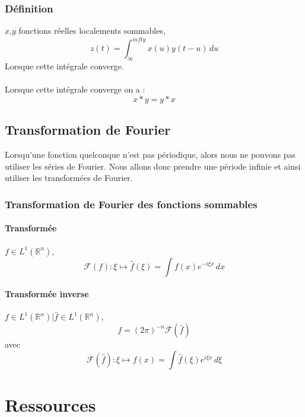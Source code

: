 \documentclass[a4paper]{book}
\begin{document}
\section{Définition}
$x$,$y$ fonctions réelles localements sommables,
\begin{equation}
	z(t) = \int_{\infty}^{infty} x(u) y(t-u) \, du
\end{equation}
Lorsque cette intégrale converge.\\
\\
Lorsque cette intégrale converge on a :
\begin{equation}
	x * y = y * x
\end{equation}

\chapter{Transformation de Fourier}
Lorsqu'une fonction quelconque n'est pas périodique, alors nous ne pouvons pas
utiliser les séries de Fourier. Nous allons donc prendre une période infinie et
ainsi utiliser les transformées de Fourier.

\section{Transformation de Fourier des fonctions sommables}
\subsection{Transformée}
$f \in L^{1}(\mathbb{R}^{n})$,
\[
	\mathcal{F}(f) : \xi \mapsto \hat{f} (\xi) = \int f(x) e^{-i \xi x} \, dx
\]
\subsection{Transformée inverse}
$f \in L^{1}(\mathbb{R}^{n}) | \hat{f} \in  L^{1}(\mathbb{R}^{n})$,
\[
	f = (2\pi)^{-n} \overline{\mathcal{F}}(\hat{f})
\]
avec
\[
	\overline{\mathcal{F}}(\hat{f}) : \xi \mapsto f (x) = \int \hat{f}(\xi)
	e^{i \xi x} \, d\xi
\]



\part{Ressources}
\end{document}
